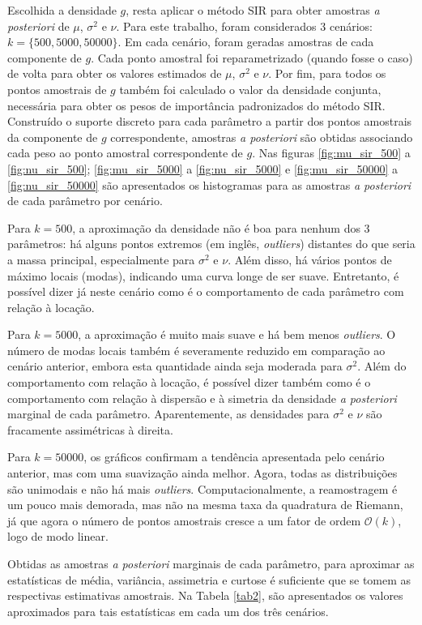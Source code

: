 Escolhida a densidade $g$, resta aplicar o método SIR para obter amostras \textit{a posteriori} de $\mu$, $\sigma^2$ e $\nu$. Para este trabalho, foram considerados 3 cenários: $k = \{500, 5000, 50000\}$. Em cada cenário, foram geradas amostras de cada componente de $g$. Cada ponto amostral foi reparametrizado (quando fosse o caso) de volta para obter os valores estimados de $\mu$, $\sigma^2$ e $\nu$. Por fim, para todos os pontos amostrais de $g$ também foi calculado o valor da densidade conjunta, necessária para obter os pesos de importância padronizados do método SIR. Construído o suporte discreto para cada parâmetro a partir dos pontos amostrais da componente de $g$ correspondente, amostras \textit{a posteriori} são obtidas associando cada peso ao ponto amostral correspondente de $g$. Nas figuras \ref{fig:mu_sir_500} a \ref{fig:nu_sir_500}; \ref{fig:mu_sir_5000} a \ref{fig:nu_sir_5000} e \ref{fig:mu_sir_50000} a \ref{fig:nu_sir_50000} são apresentados os histogramas para as amostras \textit{a posteriori} de cada parâmetro por cenário.

Para $k=500$, a aproximação da densidade não é boa para nenhum dos 3 parâmetros: há alguns pontos extremos (em inglês, \textit{outliers}) distantes do que seria a massa principal, especialmente para $\sigma^2$ e $\nu$. Além disso, há vários pontos de máximo locais (modas), indicando uma curva longe de ser suave. Entretanto, é possível dizer já neste cenário como é o comportamento de cada parâmetro com relação à locação.

Para $k=5000$, a aproximação é muito mais suave e há bem menos \textit{outliers}. O número de modas locais também é severamente reduzido em comparação ao cenário anterior, embora esta quantidade ainda seja moderada para $\sigma^2$. Além do comportamento com relação à locação, é possível dizer também como é o comportamento com relação à dispersão e à simetria da densidade \textit{a posteriori} marginal de cada parâmetro. Aparentemente, as densidades para $\sigma^2$ e $\nu$ são fracamente assimétricas à direita.

Para $k=50000$, os gráficos confirmam a tendência apresentada pelo cenário anterior, mas com uma suavização ainda melhor. Agora, todas as distribuições são unimodais e não há mais \textit{outliers}. Computacionalmente, a reamostragem é um pouco mais demorada, mas não na mesma taxa da quadratura de Riemann, já que agora o número de pontos amostrais cresce a um fator de ordem $\mathcal{O}(k)$, logo de modo linear.

Obtidas as amostras \textit{a posteriori} marginais de cada parâmetro, para aproximar as estatísticas de média, variância, assimetria e curtose é suficiente que se tomem as respectivas estimativas amostrais. Na Tabela \ref{tab2}, são apresentados os valores aproximados para tais estatísticas em cada um dos três cenários.

